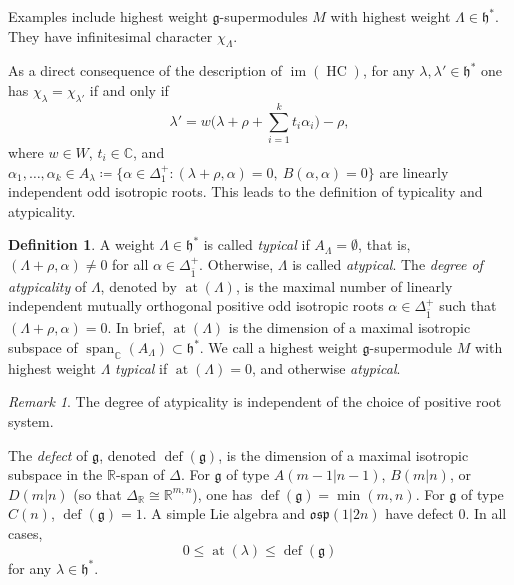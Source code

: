 \documentclass[11pt]{amsart}
\renewcommand{\Im}{\operatorname{im}}
\def\CC{{\mathbb C}}
\def\RR{{\mathbb R}}
\def\osp{{\mathfrak{osp}}}
\def\hh{{\mathfrak h}}
\def \at{{\operatorname{at}}}
\def\gg{{\mathfrak{g}}}
\theoremstyle{plain}
\theoremstyle{remark}
\theoremstyle{definition}
\newtheorem{definition}[theorem]{Definition}
\numberwithin{equation}{section}
\theoremstyle{remark}
\newtheorem{remark}[theorem]{Remark}
\begin{document}
Examples include highest weight $\gg$-supermodules $M$ with highest weight $\Lambda \in \hh^{\ast}$. They have infinitesimal character $\chi_{\Lambda}$. 

As a direct consequence of the description of $\Im(\operatorname{HC})$, for any $\lambda,\lambda'\in\hh^{\ast}$ one has
$\chi_{\lambda}=\chi_{\lambda'}$ if and only if
\begin{equation*}
 \lambda'=w\biggl(\lambda+\rho+\sum_{i=1}^{k} t_{i}\alpha_{i}\biggr)-\rho,
\end{equation*}
where $w\in W$, $t_i\in\CC$, and $\alpha_1,\dots,\alpha_k\in A_{\lambda}\coloneqq \{\alpha\in\Delta_{1}^{+}:(\lambda+\rho,\alpha)=0, \ B(\alpha,\alpha)=0\}$
are linearly independent odd isotropic roots. This leads to the definition of typicality and atypicality.

\begin{definition}
 A weight $\Lambda \in \hh^{\ast}$ is called \emph{typical} if $A_\Lambda=\emptyset$, that is,
$(\Lambda+\rho,\alpha)\neq 0$ for
all $\alpha \in \Delta_{\bar{1}}^{+}$. Otherwise, $\Lambda$ is called \emph{atypical}. The
\emph{degree of atypicality} of $\Lambda$, denoted by $\at(\Lambda)$, is the maximal number of
linearly independent mutually orthogonal positive odd isotropic roots 
$\alpha \in \Delta_{\bar{1}}^{+}$
such that $(\Lambda + \rho,\alpha)=0$. In brief, $\at(\Lambda)$ is the dimension of a maximal
isotropic subspace of $\operatorname{span}_\CC(A_{\Lambda})\subset \hh^{\ast}$. We call a highest weight 
$\gg$-supermodule $M$ with highest weight $\Lambda$ \emph{typical} if $\at(\Lambda)=0$, and 
otherwise \emph{atypical}.
\end{definition}

\begin{remark}
 The degree of atypicality is independent of the choice of positive root system. 
\end{remark}

The \emph{defect} of $\gg$, denoted $\operatorname{def}(\gg)$, is the dimension of a maximal isotropic subspace in the $\RR$-span of $\Delta$.
For $\gg$ of type $A(m-1|n-1)$, $B(m|n)$, or $D(m|n)$ (so that $\Delta_{\RR}\cong \RR^{m,n}$), one has
$\operatorname{def}(\gg)=\min(m,n)$. For $\gg$ of type $C(n)$, $\operatorname{def}(\gg)=1$. A simple Lie algebra and $\osp(1|2n)$ have defect $0$.
In all cases,
\begin{equation}
 0\le \at(\lambda)\le \operatorname{def}(\gg)
\end{equation}
for any $\lambda\in\hh^{\ast}$.
\end{document}
